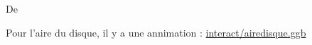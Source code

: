 


De \cite{SIUXooOJshFN}


Pour l'aire du disque, il y a une annimation\cite{RHJUooRIQIuv} :
\url{interact/airedisque.ggb}
